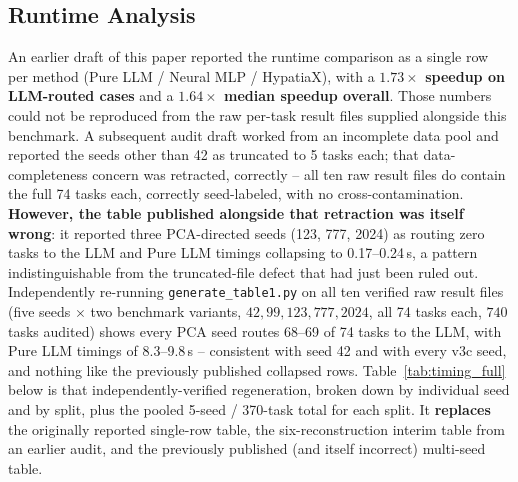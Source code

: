\documentclass[twoside,11pt]{article}
\begin{document}
\subsection{Runtime Analysis}\label{subsec:runtime-analysis}
\label{sec:timing}

An earlier draft of this paper reported the runtime comparison as a single
row per method (Pure LLM / Neural MLP / HypatiaX), with a
\textbf{$1.73\times$ speedup on LLM-routed cases} and a
\textbf{$1.64\times$ median speedup overall}. Those numbers could not be
reproduced from the raw per-task result files supplied alongside this
benchmark. A subsequent audit draft worked from an incomplete data pool
and reported the seeds other than 42 as truncated to 5 tasks each; that
data-completeness concern was retracted, correctly -- all ten raw result
files do contain the full 74 tasks each, correctly seed-labeled, with no
cross-contamination. \textbf{However, the table published alongside that
retraction was itself wrong}: it reported three PCA-directed seeds (123,
777, 2024) as routing zero tasks to the LLM and Pure LLM timings
collapsing to 0.17--0.24\,s, a pattern indistinguishable from the
truncated-file defect that had just been ruled out. Independently
re-running \texttt{generate\_table1.py} on all ten verified raw result
files (five seeds $\times$ two benchmark variants, $42, 99, 123, 777,
2024$, all 74 tasks each, $740$ tasks audited) shows every PCA seed
routes 68--69 of 74 tasks to the LLM, with Pure LLM timings of
8.3--9.8\,s -- consistent with seed 42 and with every v3c seed, and
nothing like the previously published collapsed rows. Table~\ref{tab:timing_full}
below is that independently-verified regeneration, broken down by
individual seed and by split, plus the pooled 5-seed / 370-task total for
each split. It \textbf{replaces} the originally reported single-row
table, the six-reconstruction interim table from an earlier audit, and
the previously published (and itself incorrect) multi-seed table.
\end{document}
